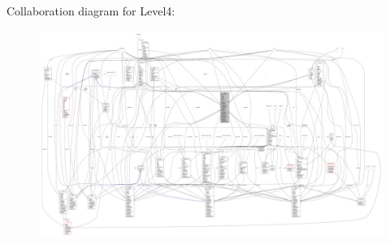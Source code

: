 Collaboration diagram for Level4\+:
\nopagebreak
\begin{figure}[H]
\begin{center}
\leavevmode
\includegraphics[width=350pt]{classscenes_1_1_level4__coll__graph}
\end{center}
\end{figure}
